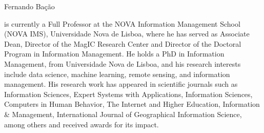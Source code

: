 \documentclass[10pt,journal,compsoc]{IEEEtran}
\begin{document}
\begin{IEEEbiography}{Fernando Bação}

is currently a Full Professor at the NOVA Information Management School (NOVA
IMS), Universidade Nova de Lisboa, where he has served as Associate Dean,
Director of the MagIC Research Center and Director of the Doctoral Program in
Information Management. He holds a PhD in Information Management, from
Universidade Nova de Lisboa, and his research interests include data science,
machine learning, remote sensing, and information management. His research
work has appeared in scientific journals such as Information Sciences, Expert
Systems with Applications, Information Sciences, Computers in Human Behavior,
The Internet and Higher Education, Information \& Management, International
Journal of Geographical Information Science, among others and received awards
for its impact. 

\end{IEEEbiography}






\end{document}
